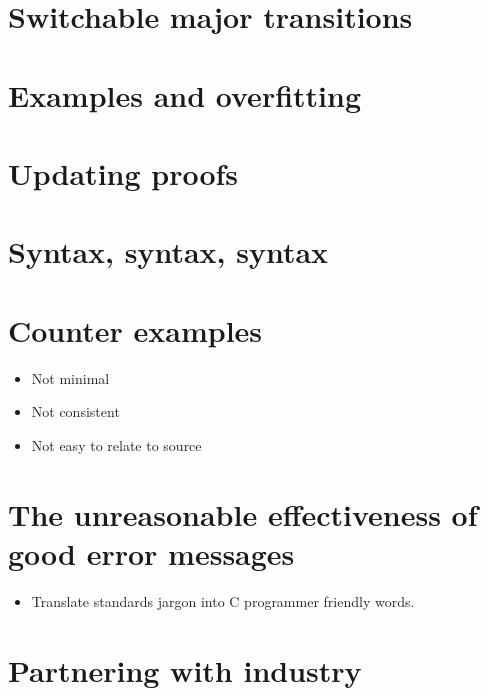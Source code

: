\section{Switchable major transitions}

\section{Examples and overfitting}

\section{Updating proofs}

\section{Syntax, syntax, syntax}

\section{Counter examples}\label{sec:counter-ex}

\begin{itemize}
    \item Not minimal
    \item Not consistent
    \item Not easy to relate to source
\end{itemize}

\section{The unreasonable effectiveness of good error messages}\label{sec:error-msgs}

\begin{itemize}
    \item Translate standards jargon into C programmer friendly words.
\end{itemize}

\section{Partnering with industry}

